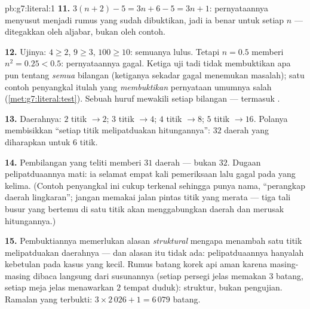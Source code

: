 \begin{solution}{pb:g7:literal:1}
\textbf{11.} $3(n + 2) - 5 = 3n + 6 - 5 = 3n + 1$: pernyataannya
menyusut menjadi rumus yang sudah dibuktikan, jadi ia benar untuk
setiap $n$ --- ditegakkan oleh aljabar, bukan oleh contoh.

\textbf{12.} Ujinya: $4 \geq 2$, $9 \geq 3$, $100 \geq 10$: semuanya
lulus. Tetapi $n = 0.5$ memberi $n^2 = 0.25 < 0.5$: pernyataannya
gagal. Ketiga uji tadi tidak membuktikan apa pun tentang \emph{semua}
bilangan (ketiganya sekadar gagal menemukan masalah); satu contoh
penyangkal itulah yang \emph{membuktikan} pernyataan umumnya salah
(\cref{met:g7:literal:test}). Sebuah huruf mewakili setiap bilangan
--- termasuk .

\textbf{13.} Daerahnya: $2$ titik $\to 2$; $3$ titik $\to 4$;
$4$ titik $\to 8$; $5$ titik $\to 16$. Polanya membisikkan
``setiap titik melipatduakan hitungannya'': $32$ daerah yang
diharapkan untuk $6$ titik.

\textbf{14.} Pembilangan yang teliti memberi $31$ daerah --- bukan
$32$. Dugaan pelipatduaannya mati: ia selamat empat kali pemeriksaan
lalu gagal pada yang kelima. (Contoh penyangkal ini cukup terkenal
sehingga punya nama, ``perangkap daerah lingkaran''; jangan memakai
jalan pintas titik yang merata --- tiga tali busur yang bertemu di
satu titik akan menggabungkan daerah dan merusak hitungannya.)

\textbf{15.} Pembuktiannya memerlukan alasan \emph{struktural}
mengapa menambah satu titik melipatduakan daerahnya --- dan alasan
itu tidak ada: pelipatduaannya hanyalah kebetulan pada kasus yang
kecil. Rumus batang korek api aman karena masing-masing dibaca
langsung dari susunannya (setiap persegi jelas memakan $3$ batang,
setiap meja jelas menawarkan $2$ tempat duduk): struktur, bukan
pengujian. Ramalan yang terbukti: $3 \times 2\,026 + 1 = 6\,079$ batang.

\end{solution}

